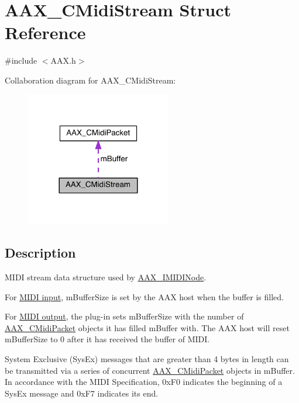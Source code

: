 \hypertarget{a00025}{}\section{A\+A\+X\+\_\+\+C\+Midi\+Stream Struct Reference}
\label{a00025}


{\ttfamily \#include $<$A\+A\+X.\+h$>$}



Collaboration diagram for A\+A\+X\+\_\+\+C\+Midi\+Stream\+:
\nopagebreak
\begin{figure}[H]
\begin{center}
\leavevmode
\includegraphics[width=180pt]{a00432}
\end{center}
\end{figure}


\subsection{Description}
M\+I\+D\+I stream data structure used by \hyperlink{a00105}{A\+A\+X\+\_\+\+I\+M\+I\+D\+I\+Node}. 

For \hyperlink{a00206_a5e1dffce35d05990dbbad651702678e4ae57de2b04978fe2e75f5bdeb034bda44}{M\+I\+D\+I input}, m\+Buffer\+Size is set by the A\+A\+X host when the buffer is filled.

For \hyperlink{a00206_a5e1dffce35d05990dbbad651702678e4acc1b5f2109c508b20a65b5e0fdcd643f}{M\+I\+D\+I output}, the plug-\/in sets m\+Buffer\+Size with the number of \hyperlink{a00024}{A\+A\+X\+\_\+\+C\+Midi\+Packet} objects it has filled m\+Buffer with. The A\+A\+X host will reset m\+Buffer\+Size to 0 after it has received the buffer of M\+I\+D\+I.

System Exclusive (Sys\+Ex) messages that are greater than 4 bytes in length can be transmitted via a series of concurrent \hyperlink{a00024}{A\+A\+X\+\_\+\+C\+Midi\+Packet} objects in m\+Buffer. In accordance with the M\+I\+D\+I Specification, {\ttfamily 0x\+F0} indicates the beginning of a Sys\+Ex message and {\ttfamily 0x\+F7} indicates its end.

